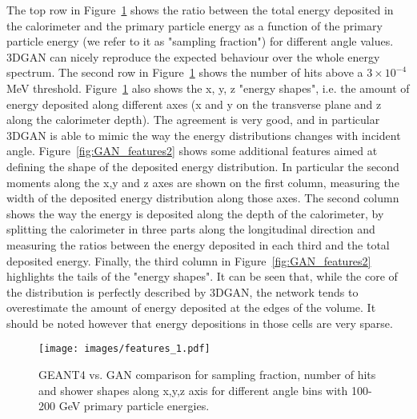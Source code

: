 The top row in Figure~\ref{fig:GAN_features1} shows the ratio between the total energy deposited in the calorimeter and the primary particle energy as a function of the primary particle energy (we refer to it as "sampling fraction") for different angle values. 3DGAN can nicely reproduce the expected behaviour over the whole energy spectrum. The second row in Figure~\ref{fig:GAN_features1} shows the number of hits above a $3 \times 10^{-4}$ MeV threshold. Figure~\ref{fig:GAN_features1} also shows the x, y, z "energy shapes", i.e. the amount of energy deposited along different axes (x and y on the transverse plane and z along the calorimeter depth). The agreement is very good, and in particular 3DGAN is able to mimic the way the energy distributions changes with incident angle. 
Figure~\ref{fig:GAN_features2} shows some additional features aimed at defining the shape of the deposited energy distribution. In particular the second moments along the x,y and z axes are shown on the first column, measuring the width of the deposited energy distribution along those axes. The second column shows the way the energy is deposited along the depth of the calorimeter, by splitting the calorimeter in three parts along the longitudinal direction and measuring the ratios between the energy deposited in each third  and the total deposited energy. Finally, the third column in Figure~\ref{fig:GAN_features2} highlights the tails of the "energy shapes". It can be seen that, while the core of the distribution is perfectly described by 3DGAN, the network tends to overestimate the amount of energy deposited at the edges of the volume. It should be noted however that energy depositions in those cells are very sparse. 
\iffalse
\begin{figure}
    \centering
    \texttt{[image: images/GAN\_feature\_ECAL\_E.png]}
    \texttt{[image: images/GAN\_feature\_ECAL\_nHits.png]}
    \texttt{[image: images/GAN\_feature\_ECAL\_ratioFirstLayerToSecondLayerE.png]}
    \texttt{[image: images/GAN\_feature\_ECAL\_ratioFirstLayerToTotalE.png]}
    \texttt{[image: images/GAN\_feature\_ECALmomentX1.png]}
    \texttt{[image: images/GAN\_feature\_ECALmomentX2.png]}
    \texttt{[image: images/GAN\_feature\_ECALmomentX3.png]}
    \texttt{[image: images/GAN\_feature\_ECALmomentY1.png]}
    \texttt{[image: images/GAN\_feature\_ECALmomentZ1.png]}
    \texttt{[image: images/GAN\_feature\_R9.png]}
    \caption{GAN vs. GEANT comparisons for various features. {\bf theta should be $\theta$.}
    \label{fig:GAN_features}}
\end{figure}
\fi
\begin{figure}
    \centering
    \texttt{[image: images/features\_1.pdf]}
    \caption{GEANT4 vs. GAN comparison for sampling fraction, number
      of hits and shower shapes along x,y,z axis for different angle
      bins with 100-200 GeV primary particle energies.
      \label{fig:GAN_features1}}
\end{figure}

